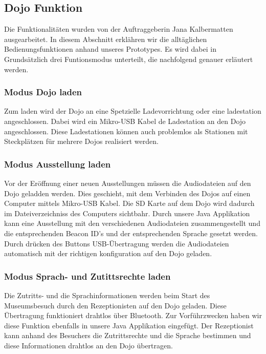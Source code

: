 \subsection{Dojo Funktion}
Die Funktionalitäten wurden von der Auftraggeberin Jana Kalbermatten ausgearbeitet. In diesem Abschnitt erklähren wir die alltäglichen Bedienungsfunktionen anhand unseres Prototypes. Es wird dabei in Grundsätzlich drei Funtionsmodus unterteilt, die nachfolgend genauer erläutert werden.
\subsubsection{Modus Dojo laden}
Zum laden wird der Dojo an eine Spetzielle Ladevorrichtung oder eine ladestation angeschlossen. Dabei wird ein Mikro-USB Kabel de Ladestation an den Dojo angeschlossen. Diese Ladestationen können auch problemlos als Stationen mit Steckplätzen für mehrere Dojos realisiert werden.
\subsubsection{Modus Ausstellung laden}
Vor der Eröffnung einer neuen Ausstellungen müssen die Audiodateien auf den Dojo geladden werden. Dies geschieht, mit dem Verbinden des Dojos auf einen Computer mittels Mikro-USB Kabel. Die SD Karte auf dem Dojo wird dadurch im Dateiverzeichniss des Computers sichtbahr. Durch unsere Java Applikation kann eine Ausstellung mit den verschiedenen Audiodateien zusammengestellt und die entsprechenden Beacon ID's und der entsprechenden Sprache gesetzt werden. Durch drücken des Buttons USB-Übertragung werden die Audiodateien automatisch mit der richtigen konfiguration auf den Dojo geladen.

\subsubsection{Modus Sprach- und Zutittsrechte laden}
Die Zutritts- und die Sprachinformationen werden beim Start des Museumsbesuch durch den Rezeptionisten auf den Dojo geladen. Diese Übertragung funktioniert drahtlos über Bluetooth. Zur Vorführzwecken haben wir diese Funktion ebenfalls in unsere Java Applikation eingefügt. Der Rezeptionist kann anhand des Besuchers die Zutrittsrechte und die Sprache bestimmen und diese Informationen drahtlos an den Dojo übertragen.

